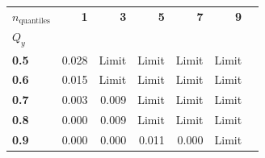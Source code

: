 \begin{tabular}{lrrrrrr}
\toprule
\textbf{$n_{\text{quantiles}}$} & \textbf{1} & \textbf{3} & \textbf{5} & \textbf{7} & \textbf{9} \\
\textbf{$Q_y$} &  &  &  &  &  \\
\midrule
\textbf{0.5} & {\cellcolor[HTML]{C6E0B4}} \num{0.028} & {\cellcolor[HTML]{F4CCCC}} Limit & {\cellcolor[HTML]{F4CCCC}} Limit & {\cellcolor[HTML]{F4CCCC}} Limit & {\cellcolor[HTML]{F4CCCC}} Limit \\
\textbf{0.6} & {\cellcolor[HTML]{C6E0B4}} \num{0.015} & {\cellcolor[HTML]{F4CCCC}} Limit & {\cellcolor[HTML]{F4CCCC}} Limit & {\cellcolor[HTML]{F4CCCC}} Limit & {\cellcolor[HTML]{F4CCCC}} Limit \\
\textbf{0.7} & {\cellcolor[HTML]{C6E0B4}} \num{0.003} & {\cellcolor[HTML]{C6E0B4}} \num{0.009} & {\cellcolor[HTML]{F4CCCC}} Limit & {\cellcolor[HTML]{F4CCCC}} Limit & {\cellcolor[HTML]{F4CCCC}} Limit \\
\textbf{0.8} & {\cellcolor[HTML]{C6E0B4}} \num{0.000} & {\cellcolor[HTML]{C6E0B4}} \num{0.009} & {\cellcolor[HTML]{F4CCCC}} Limit & {\cellcolor[HTML]{F4CCCC}} Limit & {\cellcolor[HTML]{F4CCCC}} Limit \\
\textbf{0.9} & {\cellcolor[HTML]{C6E0B4}} \num{0.000} & {\cellcolor[HTML]{C6E0B4}} \num{0.000} & {\cellcolor[HTML]{C6E0B4}} \num{0.011} & {\cellcolor[HTML]{C6E0B4}} \num{0.000} & {\cellcolor[HTML]{F4CCCC}} Limit \\
\bottomrule
\end{tabular}
